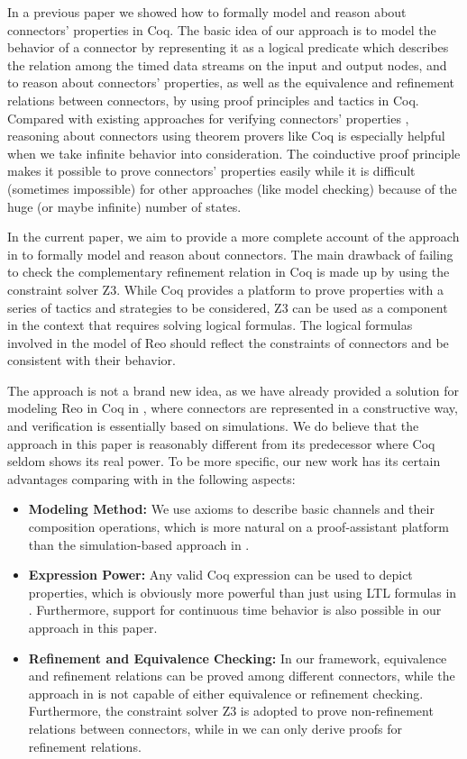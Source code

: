 \documentclass[preprint,3p]{elsarticle}
\begin{document}
In a previous paper \cite{ZHL+17} we showed how to formally model and reason about connectors' properties in Coq. The basic idea of our approach is to model the behavior of a connector by representing it as a logical predicate which describes the relation among the timed data streams on the input and output nodes, and to reason about connectors' properties, as well as the equivalence and refinement relations between connectors, by using proof principles and tactics in Coq. Compared with existing approaches for verifying connectors' properties \cite{BBK+10,KB09,KKV12}, reasoning about connectors using theorem provers like Coq is especially helpful when we take infinite behavior into consideration. The coinductive proof principle makes it possible to prove connectors' properties easily while it is difficult (sometimes impossible) for other approaches (like model checking) because of the huge (or maybe infinite) number of states.

In the current paper, we aim to provide a more complete account of the approach in \cite{ZHL+17} to formally model and reason about connectors. The main drawback of failing to check the complementary refinement relation in Coq is made up by using the constraint solver Z3. While Coq provides a platform to prove properties with a series of tactics and strategies to be considered, Z3 can be used as a component in the context %
that requires solving logical formulas. The logical formulas involved in the model of Reo should reflect the constraints of connectors and be consistent with their behavior.

The approach is not a brand new idea, as we have already provided a solution for modeling Reo in Coq in \cite{LS15}, where connectors are represented in a constructive way, and verification is essentially based on simulations. We do believe that the approach in this paper is reasonably different from its predecessor \cite{LS15} where Coq seldom shows its real power. To be more specific, our new work has its certain
advantages comparing with \cite{LS15} in the following aspects:
\begin{itemize}
\item {\bf Modeling Method:} We use axioms to describe basic channels and their composition operations, which is more natural on a proof-assistant platform than the simulation-based approach in \cite{LS15}.
\item {\bf Expression Power:} Any valid Coq expression can be used to depict properties, which is obviously more powerful than just using LTL formulas in \cite{LS15}. Furthermore, support for continuous time behavior is also possible in our approach in this paper.
\item {\bf Refinement and Equivalence Checking:} In our framework, equivalence and refinement relations can be proved among different connectors, while the approach in \cite{LS15} is not capable of either equivalence or refinement checking. Furthermore, the constraint solver Z3 is adopted to prove non-refinement relations between connectors, while in \cite{ZHL+17} we can only derive proofs for refinement relations.
\end{itemize}
\end{document}
